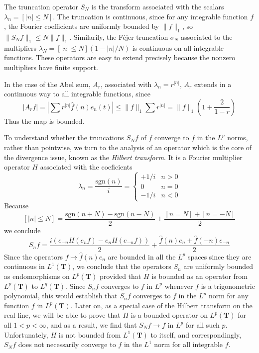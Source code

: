 \begin{example}
    The truncation operator $S_N$ is the transform associated with the scalars $\lambda_n = [|n| \leq N]$. The truncation is continuous, since for any integrable function $f$, the Fourier coefficients are uniformly bounded by $\| f \|_1$, so $\| S_N f \|_1 \leq N \| f \|_1$. Similarily, the F\'{e}jer truncation $\sigma_N$ associated to the multipliers $\lambda_N = [|n| \leq N](1 - |n|/N)$ is continuous on all integrable functions. These operators are easy to extend precisely because the nonzero multipliers have finite support.
\end{example}

\begin{example}
    In the case of the Abel sum, $A_r$, associated with $\lambda_n = r^{|n|}$, $A_r$ extends in a continuous way to all integrable functions, since
    \[ |A_r f| = \left| \sum r^{|n|} \widehat{f}(n) e_n(t) \right| \leq \| f \|_1 \sum r^{|n|} = \| f \|_1 \left( 1 + \frac{2}{1 - r} \right) \]
    Thus the map is bounded.
\end{example}

To understand whether the truncations $S_N f$ of $f$ converge to $f$ in the $L^p$ norms, rather than pointwise, we turn to the analysis of an operator which is the core of the divergence issue, known as the \emph{Hilbert transform}. It is a Fourier multiplier operator $H$ associated with the coeficients
%
\[ \lambda_n = \frac{\text{sgn}(n)}{i} = \begin{cases} +1/i & n > 0 \\ 0 & n = 0 \\ -1/i & n < 0 \end{cases} \]
%
Because
%
\[ [|n| \leq N] = \frac{\text{sgn}(n + N) - \text{sgn}(n-N)}{2} + \frac{[n = N] + [n = -N]}{2} \]
%
we conclude
%
\[ S_n f = \frac{i \left( e_{-n} H(e_n f) - e_n H(e_{-n} f) \right)}{2} + \frac{\widehat{f}(n) e_n + \widehat{f}(-n) e_{-n}}{2} \]
%
Since the operators $f \mapsto \widehat{f}(n) e_n$ are bounded in all the $L^p$ spaces since they are continuous in $L^1(\mathbf{T})$, we conclude that the operators $S_n$ are uniformly bounded as endomorphisms on $L^p(\mathbf{T})$ provided that $H$ is bounded as an operator from $L^p(\mathbf{T})$ to $L^q(\mathbf{T})$. Since $S_n f$ converges to $f$ in $L^p$ whenever $f$ is a trigonometric polynomial, this would establish that $S_n f$ converges to $f$ in the $L^p$ norm for any function $f$ in $L^p(\mathbf{T})$. Later on, as a special case of the Hilbert transform on the real line, we will be able to prove that $H$ is a bounded operator on $L^p(\mathbf{T})$ for all $1 < p < \infty$, and as a result, we find that $S_N f \to f$ in $L^p$ for all such $p$. Unfortunately, $H$ is not bounded from $L^1(\mathbf{T})$ to itself, and correspondingly, $S_N f$ does not necessarily converge to $f$ in the $L^1$ norm for all integrable $f$.

